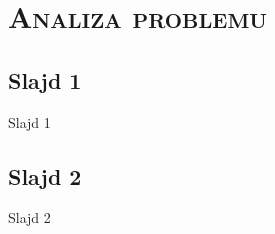 \section{\scshape Analiza problemu}

\subsection{Slajd 1}
\begin{frame}{Slajd 1}
\end{frame}

\subsection{Slajd 2}
\begin{frame}{Slajd 2}
\end{frame}